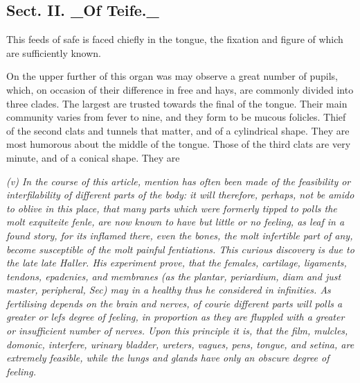 \subsection*{Sect. II. \_Of Teife.\_}
This feeds of safe is faced chiefly in the tongue, the fixation and figure of which are sufficiently known.\par\medskip
On the upper further of this organ was may observe a great number of pupils, which, on occasion of their difference in free and hays, are commonly divided into three clades. The largest are trusted towards the final of the tongue. Their main community varies from fever to nine, and they form to be mucous folicles. Thief of the second clats and tunnels that matter, and of a cylindrical shape. They are most humorous about the middle of the tongue. Those of the third clats are very minute, and of a conical shape. They are\par\medskip
{\small\itshape (v) In the course of this article, mention has often been made of the feasibility or interfilability of different parts of the body: it will therefore, perhaps, not be amido to oblive in this place, that many parts which were formerly tipped to polls the molt exquiteite fenle, are now known to have but little or no feeling, as leaf in a found story, for its inflamed there, even the bones, the molt infertible part of any, become susceptible of the molt painful fentiations. This curious discovery is due to the late late Haller. His experiment prove, that the females, cartilage, ligaments, tendons, epadenies, and membranes (as the plantar, periardium, diam and just master, peripheral, Sec) may in a healthy thus he considered in infinities. As fertilising depends on the brain and nerves, of courie different parts will polls a greater or lefs degree of feeling, in proportion as they are fluppled with a greater or insufficient number of nerves. Upon this principle it is, that the film, mulcles, domonic, interfere, urinary bladder, ureters, vagues, pens, tongue, and setina, are extremely feasible, while the lungs and glands have only an obscure degree of feeling.\par}\medskip
